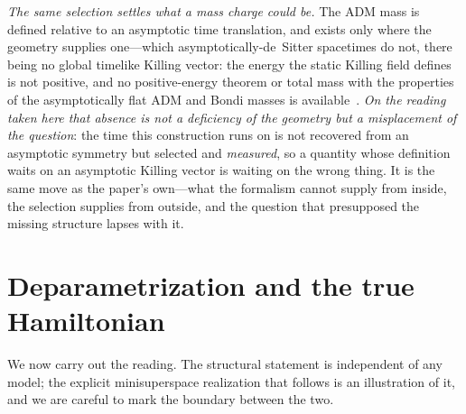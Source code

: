 \documentclass[11pt,a4paper]{article}
\theoremstyle{plain}
\theoremstyle{definition}
\theoremstyle{remark}
\begin{document}
\emph{The same selection settles what a mass charge could be.} The ADM mass is defined relative to an asymptotic time translation, and exists only where the geometry supplies one---which asymptotically-de~Sitter spacetimes do not, there being no global timelike Killing vector: the energy the static Killing field defines~\cite{AbbottDeser1982} is not positive, and no positive-energy theorem or total mass with the properties of the asymptotically flat ADM and Bondi masses is available~\cite{AshtekarBongaKesavan2015, JanzenSlicing}. \emph{On the reading taken here that absence is not a deficiency of the geometry but a misplacement of the question}: the time this construction runs on is not recovered from an asymptotic symmetry but selected and \emph{measured}, so a quantity whose definition waits on an asymptotic Killing vector is waiting on the wrong thing. It is the same move as the paper's own---what the formalism cannot supply from inside, the selection supplies from outside, and the question that presupposed the missing structure lapses with it.

\section{Deparametrization and the true Hamiltonian}\label{sec:deparam}

We now carry out the reading. The structural statement is independent of any model; the explicit minisuperspace realization that follows is an illustration of it, and we are careful to mark the boundary between the two.
\end{document}
